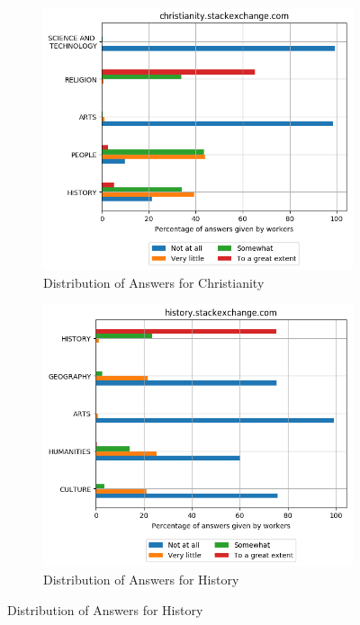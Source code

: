 \begin{figure}[H]
        
     \begin{subfigure}{0.5\textwidth}
    \centering
        \includegraphics[width=1\linewidth]{imgs/crowd-results/christianity_stackexchange_com}
        \caption{Distribution of Answers for Christianity}
        \label{fig:crowd-history}
    \end{subfigure}%
    \begin{subfigure}{0.5\textwidth}
    \centering
        \includegraphics[width=1\linewidth]{imgs/crowd-results/history_stackexchange_com}
        \caption {Distribution of Answers for  History}
        \label{fig:crowd-history}
    \end{subfigure} 

    \end{figure}
    
